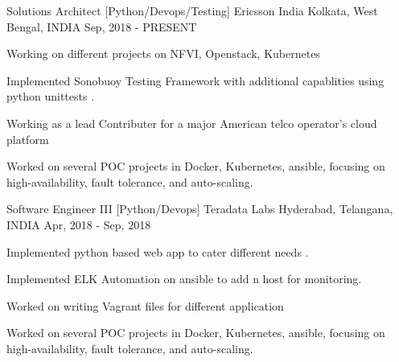 

\begin{cventries}

    \cventry
    {Solutions Architect [Python/Devops/Testing]} %
    {Ericsson India} %
    {Kolkata, West Bengal, INDIA} %
    {Sep, 2018 - PRESENT} %
    {
      \begin{cvitems} %
        \item {Working on different projects on NFVI, Openstack, Kubernetes}
        \item {Implemented Sonobuoy Testing Framework with additional capablities using python unittests .}
        \item {Working as a lead Contributer for a major American telco operator's cloud platform }
        \item {Worked on several POC projects in Docker, Kubernetes, ansible, focusing on high-availability, fault tolerance, and auto-scaling. }
      \end{cvitems}
    }

  \cventry
    {Software Engineer III [Python/Devops]} %
    {Teradata Labs} %
    {Hyderabad, Telangana, INDIA} %
    {Apr, 2018 - Sep, 2018} %
    {
      \begin{cvitems} %
        \item {Implemented python based web app to cater different needs .}
        \item {Implemented ELK Automation on ansible to add n host for monitoring. }
        \item {Worked on writing Vagrant files for different application }
        \item {Worked on several POC projects in Docker, Kubernetes, ansible, focusing on high-availability, fault tolerance, and auto-scaling. }
      \end{cvitems}
    }


\end{cventries}
